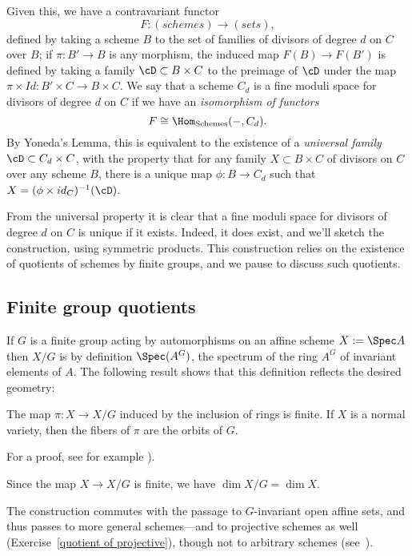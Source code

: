 Given this, we have a contravariant functor 
$$
F : (schemes) \to (sets),
$$
defined by taking a scheme $B$ to the set of families of divisors of degree $d$ on $C$over $B$; if $\pi : B' \to B$ is any morphism, the induced map $F(B) \to F(B')$ is defined by taking a family $\cD \subset B \times C$ to the preimage of $\cD$ under the map $\pi \times Id : B' \times C \to B \times C$. We say that a scheme $C_d$ is a fine moduli space for divisors of degree $d$ on $C$ if we have an \emph{isomorphism of functors}
$$
F \cong \Hom_{\rm{Schemes}}( -, C_d).
$$
By Yoneda's Lemma, this is equivalent to the existence of a \emph{universal family} $\cD \subset C_d \times C$, with the property that for any family $X \subset B \times C$ of divisors on $C$ over any scheme $B$, there is a unique map $\phi : B \to C_d$ such that $X = (\phi \times id_{C})^{-1}(\cD)$.

From the universal property it is clear that a fine moduli space for divisors of degree $d$ on $C$ is unique if it exists. Indeed, it does exist, and we'll sketch the construction, using symmetric products. This construction relies on the existence of quotients of schemes by finite groups, and we pause to discuss such quotients.

\subsection{Finite group quotients}


If $G$ is a finite group acting by automorphisms on an affine scheme $X:=\Spec A$ then $X/G$ is by definition $\Spec(A^G)$, the spectrum of the ring $A^G$ of invariant elements of $A$. The following result shows that this definition reflects the desired geometry: 

\begin{theorem}\label{finite invariant theory}

 The map $\pi: X\to X/G$ induced by the inclusion of rings is finite. If $X$ is a normal variety, then the fibers of $\pi$  are the orbits of $G$.
 
\end{theorem}
For a proof, see for example \cite[Proposition 13.10]{Eisenbud1995}).  

Since the map $X\to X/G$ is finite, we have $\dim X/G = \dim X$. 

The construction commutes with the passage to $G$-invariant open affine sets, and thus passes to more general schemes---and to projective schemes as well (Exercise~\ref{quotient of projective}), though not to arbitrary schemes (see~\cite[Example 5.3.2]{Olsson-Stacks}).

